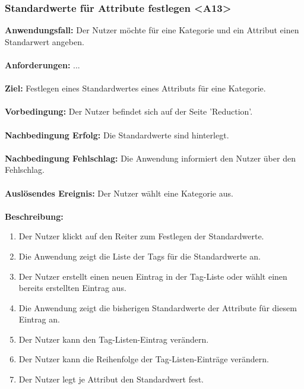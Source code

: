 \documentclass[parskip=full]{scrartcl} %
\begin{document}
\subsubsection*{Standardwerte für Attribute festlegen <A13>}
\textbf{Anwendungsfall:} Der Nutzer möchte für eine Kategorie und ein Attribut einen Standarwert angeben.\\\\
\textbf{Anforderungen:} ...\\\\
\textbf{Ziel:} Festlegen eines Standardwertes eines Attributs für eine Kategorie. \\\\
\textbf{Vorbedingung:} Der Nutzer befindet sich auf der Seite 'Reduction'. \\\\
\textbf{Nachbedingung Erfolg:} Die Standardwerte sind hinterlegt. \\\\
\textbf{Nachbedingung Fehlschlag:} Die Anwendung informiert den Nutzer über den Fehlschlag. \\\\
\textbf{Auslösendes Ereignis:} Der Nutzer wählt eine Kategorie aus. \\\\
\textbf{Beschreibung:}
\begin{enumerate}
    \item Der Nutzer klickt auf den Reiter zum Festlegen der Standardwerte.
    \item Die Anwendung zeigt die Liste der Tags für die Standardwerte an.
    \item Der Nutzer erstellt einen neuen Eintrag in der Tag-Liste oder wählt einen bereits erstellten Eintrag aus.
    \item Die Anwendung zeigt die bisherigen Standardwerte der Attribute für diesem Eintrag an.
    \item Der Nutzer kann den Tag-Listen-Eintrag verändern.
    \item Der Nutzer kann die Reihenfolge der Tag-Listen-Einträge verändern.
    \item Der Nutzer legt je Attribut den Standardwert fest.
\end{enumerate}
\newpage
\end{document}

